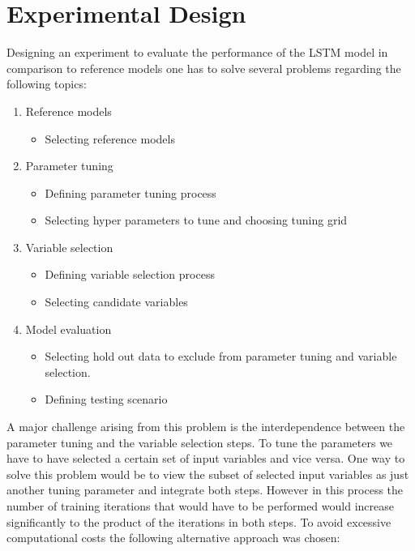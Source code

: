 \section{Experimental Design}
Designing an experiment to evaluate the performance of the LSTM model in comparison to reference models one has to solve several problems regarding the following topics:
\begin{enumerate}
\item Reference models\begin{itemize}
	\item Selecting reference models
\end{itemize}
\item Parameter tuning \begin{itemize}
	\item Defining parameter tuning process
	\item Selecting hyper parameters to tune and choosing tuning grid
\end{itemize}
\item Variable selection \begin{itemize}
	\item Defining variable selection process
	\item Selecting candidate variables
\end{itemize}
\item Model evaluation \begin{itemize}
\item Selecting hold out data to exclude from parameter tuning and variable selection.
\item Defining testing scenario
\end{itemize}	
\end{enumerate}

A major challenge arising from this problem is the interdependence between the parameter tuning and the variable selection steps. To tune the parameters we have to have selected a certain set of input variables and vice versa. One way to solve this problem would be to view the subset of selected input variables as just another tuning parameter and integrate both steps. However in this process the number of training iterations that would have to be performed would increase significantly to the product of the iterations in both steps. To avoid excessive computational costs the following alternative approach was chosen:

